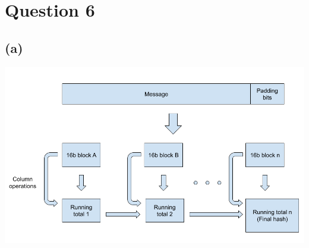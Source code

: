 \documentclass[a4paper]{article}
\begin{document}
\section*{Question 6}
\subsection*{(a)}
\includegraphics[scale=0.4]{2.png}
\end{document}
